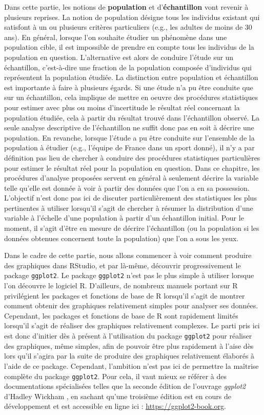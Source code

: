 \documentclass[
  french,
]{book}
\begin{document}
Dans cette partie, les notions de \textbf{population} et d'\textbf{échantillon} vont revenir à plusieurs reprises. La notion de population désigne tous les individus existant qui satisfont à un ou plusieurs critères particuliers (e.g., les adultes de moins de 30 ans). En général, lorsque l'on souhaite étudier un phénomène dans une population cible, il est impossible de prendre en compte tous les individus de la population en question. L'alternative est alors de conduire l'étude sur un échantillon, c'est-à-dire une fraction de la population composée d'individus qui représentent la population étudiée. La distinction entre population et échantillon est importante à faire à plusieurs égards. Si une étude n'a pu être conduite que sur un échantillon, cela implique de mettre en oeuvre des procédures statistiques pour estimer avec plus ou moins d'incertitude le résultat réel concernant la population étudiée, cela à partir du résultat trouvé dans l'échantillon observé. La seule analyse descriptive de l'échantillon ne suffit donc pas en soit à décrire une population. En revanche, lorsque l'étude a pu être conduite sur l'ensemble de la population à étudier (e.g., l'équipe de France dans un sport donné), il n'y a par définition pas lieu de chercher à conduire des procédures statistiques particulières pour estimer le résultat réel pour la population en question. Dans ce chapitre, les procédures d'analyse proposées servent en général à seulement décrire la variable telle qu'elle est donnée à voir à partir des données que l'on a en sa possession. L'objectif n'est donc pas ici de discuter particulièrement des statistiques les plus pertinentes à utiliser lorsqu'il s'agit de chercher à résumer la distribution d'une variable à l'échelle d'une population à partir d'un échantillon initial. Pour le moment, il s'agit d'être en mesure de décrire l'échantillon (ou la population si les données obtenues concernent toute la population) que l'on a sous les yeux.

Dans le cadre de cette partie, nous allons commencer à voir comment produire des graphiques dans RStudio, et par là-même, découvrir progressivement le package \texttt{ggplot2}. Le package \texttt{ggplot2} n'est pas le plus simple à utiliser lorsque l'on découvre le logiciel R. D'ailleurs, de nombreux manuels portant sur R privilégient les packages et fonctions de base de R lorsqu'il s'agit de montrer comment obtenir des graphiques relativement simples pour analyser ses données. Cependant, les packages et fonctions de base de R sont rapidement limités lorsqu'il s'agit de réaliser des graphiques relativement complexes. Le parti pris ici est donc d'initier dès à présent à l'utilisation du package \texttt{ggplot2} pour réaliser des graphiques, même simples, afin de pouvoir être plus rapidement à l'aise dès lors qu'il s'agira par la suite de produire des graphiques relativement élaborés à l'aide de ce package. Cependant, l'ambition n'est pas ici de permettre la maîtrise complète du package \texttt{ggplot2}. Pour cela, il vaut mieux se référer à des documentations spécialisées telles que la seconde édition de l'ouvrage \emph{ggplot2} d'Hadley Wickham \autocite*{wickhamGgplot22016}, en sachant qu'une troisième édition est en cours de développement et est accessible en ligne ici : \url{https://ggplot2-book.org}.
\end{document}
